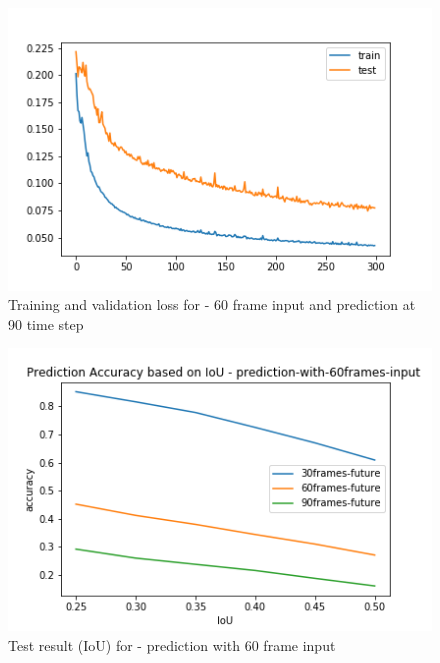 \begin{figure}[H] \label{60-90}
\includegraphics[scale=0.8]{conf13_300e_60_90ffuture}
\begin{center}
\caption{Training and validation loss for - 60 frame input and prediction at 90 time step }
\end{center}
\end{figure}

\begin{figure}[H] \label{60-IoU}
\includegraphics[scale=0.8]{prediction-with-60frames-input_IoU.png}
\begin{center}
\caption{Test result (IoU) for - prediction with 60 frame input}
\end{center}
\end{figure}


